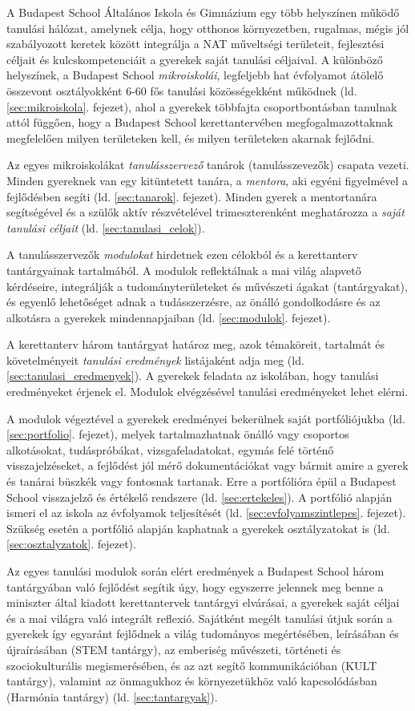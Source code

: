 A Budapest School Általános Iskola és Gimnázium egy több helyszínen működő tanulási hálózat, amelynek célja, hogy otthonos környezetben, rugalmas, mégis jól szabályozott keretek között integrálja a NAT műveltségi területeit, fejlesztési céljait és kulcskompetenciáit a gyerekek saját tanulási céljaival. A különböző helyszínek, a Budapest School \emph{mikroiskolái}, legfeljebb hat évfolyamot átölelő összevont osztályokként 6-60 fős tanulási közösségekként működnek (ld. \ref{sec:mikroiskola}. fejezet), ahol a gyerekek többfajta csoportbontásban tanulnak attól függően, hogy a Budapest School kerettantervében megfogalmazottaknak megfelelően milyen területeken kell, és milyen területeken akarnak fejlődni.

Az egyes mikroiskolákat \emph{tanulásszervező} tanárok (tanulásszevezők) csapata vezeti. Minden gyereknek van egy kitüntetett tanára, a \emph{mentora}, aki egyéni figyelmével a fejlődésben segíti (ld. \ref{sec:tanarok}. fejezet). Minden gyerek a mentortanára segítségével és a szülők aktív részvételével trimeszterenként meghatározza a \emph{saját tanulási céljait}
(ld.
\ref{sec:tanulasi_celok}).

A tanulásszervezők \emph{modulokat} hirdetnek ezen célokból és a kerettanterv tantárgyainak tartalmából. A modulok reflektálnak a mai világ alapvető kérdéseire, integrálják	a tudományterületeket és művészeti ágakat (tantárgyakat), és egyenlő lehetőséget adnak a tudásszerzésre, az önálló gondolkodásre és az alkotásra a gyerekek mindennapjaiban (ld. \ref{sec:modulok}. fejezet).

A kerettanterv három tantárgyat határoz meg, azok témaköreit, tartalmát és követelményeit \emph{tanulási eredmények} listájaként adja meg (ld. \ref{sec:tanulasi_eredmenyek}). A gyerekek feladata az iskolában, hogy tanulási eredményeket érjenek el. Modulok elvégzésével tanulási eredményeket lehet elérni.

A modulok végeztével a gyerekek eredményei bekerülnek saját portfóliójukba (ld. \ref{sec:portfolio}. fejezet), melyek tartalmazhatnak önálló vagy csoportos alkotásokat, tudáspróbákat, vizsgafeladatokat, egymás felé történő visszajelzéseket, a fejlődést jól mérő dokumentációkat vagy bármit amire a gyerek és tanárai büszkék vagy fontosnak tartanak. Erre a portfólióra épül a Budapest School visszajelző és értékelő rendszere (ld. \ref{sec:ertekeles}). A portfólió alapján ismeri el az iskola az évfolyamok teljesítését (ld. \ref{sec:evfolyamszintlepes}. fejezet). Szükség esetén a portfólió alapján kaphatnak a gyerekek osztályzatokat is (ld. \ref{sec:osztalyzatok}. fejezet).

Az egyes tanulási modulok során elért eredmények a Budapest School három tantárgyában való fejlődést segítik úgy, hogy egyszerre jelennek meg benne a miniszter által kiadott kerettantervek tantárgyi elvárásai, a gyerekek saját céljai és a mai világra való integrált reflexió. Sajátként megélt tanulási útjuk során a gyerekek így egyaránt fejlődnek a világ tudományos megértésében, leírásában és újraírásában (STEM tantárgy), az emberiség művészeti, történeti és szociokulturális megismerésében, és az azt segítő kommunikáció\-ban (KULT tantárgy), valamint az önmagukhoz és környezetükhöz való kapcsolódásban (Harmónia tantárgy) (ld. \ref{sec:tantargyak}).